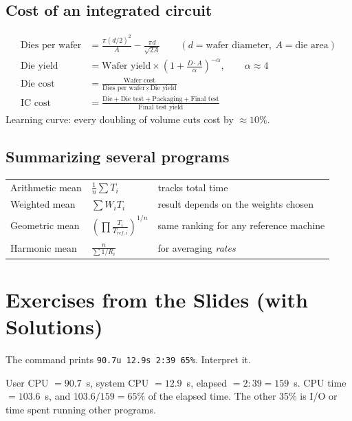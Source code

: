\documentclass[11pt]{article}
\begin{document}
\subsection{Cost of an integrated circuit}
\begin{align*}
  \text{Dies per wafer} &= \frac{\pi (d/2)^2}{A} - \frac{\pi d}{\sqrt{2A}}
  \qquad (d=\text{wafer diameter},\ A=\text{die area})\\
  \text{Die yield} &= \text{Wafer yield}\times\left(1+\frac{D\cdot A}{\alpha}\right)^{-\alpha},
  \qquad \alpha \approx 4\\
  \text{Die cost} &= \frac{\text{Wafer cost}}{\text{Dies per wafer}\times\text{Die yield}}\\
  \text{IC cost} &= \frac{\text{Die} + \text{Die test} + \text{Packaging} + \text{Final test}}{\text{Final test yield}}
\end{align*}
Learning curve: every doubling of volume cuts cost by $\approx10\%$.

\subsection{Summarizing several programs}
\begin{center}
\begin{tabular}{@{}lll@{}}
\toprule
Arithmetic mean & $\frac1n\sum T_i$ & tracks total time \\
Weighted mean & $\sum W_i T_i$ & result depends on the weights chosen \\
Geometric mean & $\left(\prod \frac{T_i}{T_{ref,i}}\right)^{1/n}$ & same ranking for any reference machine \\
Harmonic mean & $\frac{n}{\sum 1/R_i}$ & for averaging \emph{rates} \\
\bottomrule
\end{tabular}
\end{center}

\section{Exercises from the Slides (with Solutions)}

\begin{exercise}
The command prints \texttt{90.7u 12.9s 2:39 65\%}. Interpret it.
\end{exercise}
\begin{solution}
User CPU $=90.7$~s, system CPU $=12.9$~s, elapsed $=2{:}39=159$~s. CPU
time $=103.6$~s, and $103.6/159 = 65\%$ of the elapsed time. The other
35\% is I/O or time spent running other programs.
\end{solution}
\end{document}
